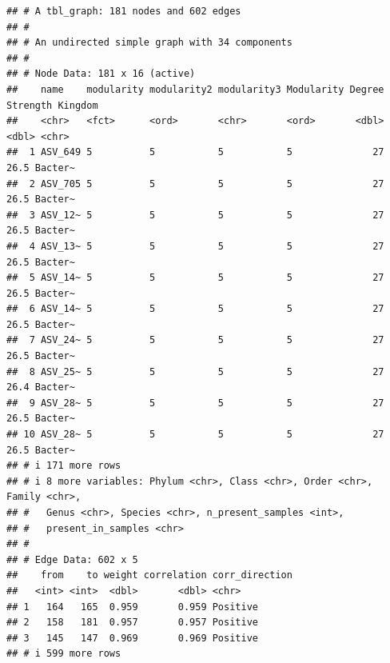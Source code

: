 \documentclass[
]{book}
\newenvironment{Shaded}{\begin{snugshade}}{\end{snugshade}}
\newcommand{\AttributeTok}[1]{\textcolor[rgb]{0.13,0.29,0.53}{#1}}
\newcommand{\CommentTok}[1]{\textcolor[rgb]{0.56,0.35,0.01}{\textit{#1}}}
\newcommand{\FunctionTok}[1]{\textcolor[rgb]{0.13,0.29,0.53}{\textbf{#1}}}
\newcommand{\NormalTok}[1]{#1}
\newcommand{\OtherTok}[1]{\textcolor[rgb]{0.56,0.35,0.01}{#1}}
\newcommand{\SpecialCharTok}[1]{\textcolor[rgb]{0.81,0.36,0.00}{\textbf{#1}}}
\begin{document}
\begin{verbatim}
## # A tbl_graph: 181 nodes and 602 edges
## #
## # An undirected simple graph with 34 components
## #
## # Node Data: 181 x 16 (active)
##    name    modularity modularity2 modularity3 Modularity Degree Strength Kingdom
##    <chr>   <fct>      <ord>       <chr>       <ord>       <dbl>    <dbl> <chr>  
##  1 ASV_649 5          5           5           5              27     26.5 Bacter~
##  2 ASV_705 5          5           5           5              27     26.5 Bacter~
##  3 ASV_12~ 5          5           5           5              27     26.5 Bacter~
##  4 ASV_13~ 5          5           5           5              27     26.5 Bacter~
##  5 ASV_14~ 5          5           5           5              27     26.5 Bacter~
##  6 ASV_14~ 5          5           5           5              27     26.5 Bacter~
##  7 ASV_24~ 5          5           5           5              27     26.5 Bacter~
##  8 ASV_25~ 5          5           5           5              27     26.4 Bacter~
##  9 ASV_28~ 5          5           5           5              27     26.5 Bacter~
## 10 ASV_28~ 5          5           5           5              27     26.5 Bacter~
## # i 171 more rows
## # i 8 more variables: Phylum <chr>, Class <chr>, Order <chr>, Family <chr>,
## #   Genus <chr>, Species <chr>, n_present_samples <int>,
## #   present_in_samples <chr>
## #
## # Edge Data: 602 x 5
##    from    to weight correlation corr_direction
##   <int> <int>  <dbl>       <dbl> <chr>         
## 1   164   165  0.959       0.959 Positive      
## 2   158   181  0.957       0.957 Positive      
## 3   145   147  0.969       0.969 Positive      
## # i 599 more rows
\end{verbatim}

\begin{Shaded}
\end{Shaded}
\end{document}
